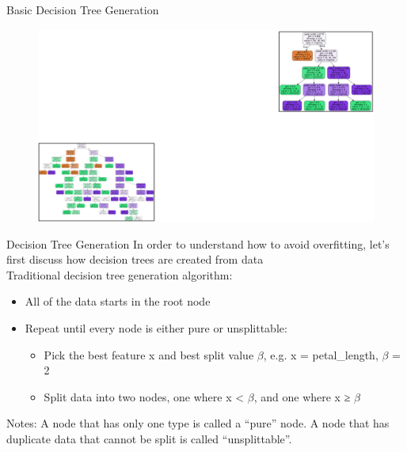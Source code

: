 \documentclass[aspectratio=169]{../latex_main/tntbeamer}  %
\begin{document}
	
		\begin{frame}{Basic Decision Tree Generation}
	    \begin{figure}
	        \centering
	        \includegraphics[scale=.3]{Bild40}
	    \end{figure}
	\end{frame}
	
	\begin{frame}{Decision Tree Generation}
	    In order to understand how to avoid overfitting, let’s first discuss how decision trees are created from data\\
	    \bigskip
	    Traditional decision tree generation algorithm: 
	    \begin{itemize}
	        \item All of the data starts in the root node
	        \item Repeat until every node is either pure or unsplittable:
	        \begin{itemize}
	            \item Pick the best feature x and best split value $\beta$, e.g. x = petal\_length, $\beta$ = 2
	            \item Split data into two nodes, one where x < $\beta$, and one where x ≥ $\beta$
	        \end{itemize}
	    \end{itemize}
	    
	    
Notes: A node that has only one type is called a “pure” node. A node that has duplicate data that cannot be split is called “unsplittable”.

	\end{frame}
	
\end{document}
